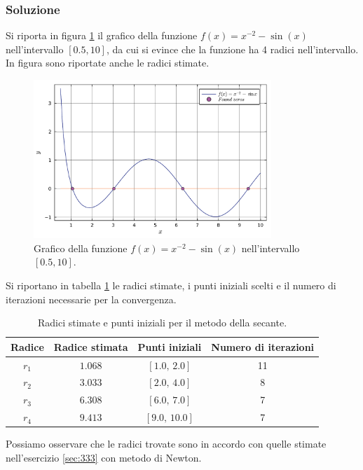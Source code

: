 \documentclass[letterpaper, 12pt]{article}
\begin{document}
\subsubsection{Soluzione}
Si riporta in figura \ref{fig:es3_4_3_1} il grafico della funzione $f(x)=x^{-2}-\sin(x)$ nell'intervallo
$[0.5,10]$, da cui si evince che la funzione ha 4 radici nell'intervallo. In figura sono riportate anche
le radici stimate.
\begin{figure}[!ht]
    \centering
    \includegraphics[width=0.8\textwidth]{3431.pdf}
    \caption{Grafico della funzione $f(x)=x^{-2}-\sin(x)$ nell'intervallo $[0.5,10]$.}
    \label{fig:es3_4_3_1}
\end{figure}

Si riportano in tabella \ref{tab:es3_4_3_1} le radici stimate, i punti iniziali scelti e il numero di iterazioni
necessarie per la convergenza.
\begin{table}
    \centering
    \begin{tabular}{|c|c|c|c|}
        \hline
        \textbf{Radice} & \textbf{Radice stimata} & \textbf{Punti iniziali} & \textbf{Numero di iterazioni} \\
        \hline
        $r_1$ & $1.068$  & $[1.0,\,2.0]$   & 11  \\
        $r_2$ & $3.033$  & $[2.0,\,4.0]$   & 8  \\
        $r_3$ & $6.308$  & $[6.0,\,7.0]$   & 7  \\
        $r_4$ & $9.413$  & $[9.0,\,10.0]$  & 7  \\
        \hline
    \end{tabular}
    \caption{Radici stimate e punti iniziali per il metodo della secante.}
    \label{tab:es3_4_3_1}
\end{table}
Possiamo osservare che le radici trovate sono in accordo con quelle stimate nell'esercizio \ref{sec:333} 
con metodo di Newton.
\end{document}
